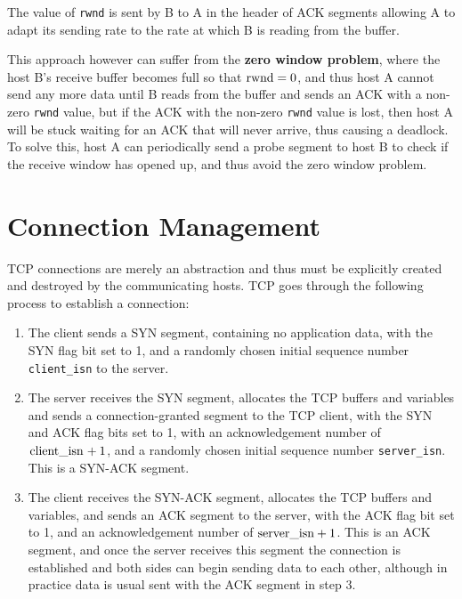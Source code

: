 \documentclass[12pt letter]{report}
\begin{document}
The value of \lstinline{rwnd} is sent by B to A in the header of ACK
segments allowing A to adapt its sending rate to the rate at which B
is reading from the buffer.

This approach however can suffer from the \textbf{zero window
problem}, where the host B's receive buffer becomes full so that
$\text{\lstinline{rwnd}} = 0$, and thus host A cannot send any more data
until B reads from the buffer and sends an ACK with a non-zero
\lstinline{rwnd} value, but if the ACK with the non-zero
\lstinline{rwnd} value is lost, then host A will be stuck waiting for
an ACK that will never arrive, thus causing a deadlock. To solve
this, host A can periodically send a probe segment to host B to check
if the receive window has opened up, and thus avoid the zero window problem.

\section{Connection Management}

TCP connections are merely an abstraction and thus must be explicitly
created and destroyed by the communicating hosts. TCP goes through
the following process to establish a connection:
\begin{enumerate}
  \item  The client sends a SYN segment, containing no application
    data, with the SYN flag bit set to 1, and a randomly chosen
    initial sequence number \lstinline{client_isn} to the server.
  \item The server receives the SYN segment, allocates the TCP
    buffers and variables and sends a connection-granted segment to
    the TCP client, with the SYN and ACK flag bits set to 1, with an
    acknowledgement number of $\text{\lstinline{client_isn}} + 1$, and a
    randomly chosen initial sequence number \lstinline{server_isn}.
    This is a SYN-ACK segment.
  \item The client receives the SYN-ACK segment, allocates the TCP buffers
    and variables, and sends an ACK segment to the server, with the ACK
    flag bit set to 1, and an acknowledgement number of
    $\text{\lstinline{server_isn}} + 1$. This is an ACK segment, and once
    the server receives this segment the connection is established
    and both sides can begin sending data to each other, although in
    practice data is usual sent with the ACK segment in step 3.
\end{enumerate}
\end{document}

